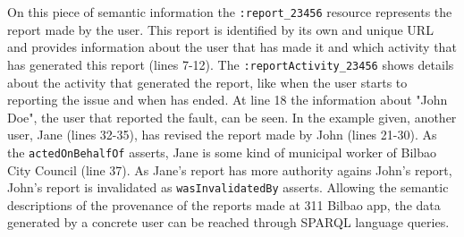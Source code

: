 On this piece of semantic information the \texttt{:report\_23456} resource represents the report made by the user. This report is identified by its own and unique URL and provides information about the user that has made it and which activity that has generated this report (lines 7-12). The \texttt{:reportActivity\_23456} shows details about the activity that generated the report, like when the user starts to reporting the issue and when has ended. At line 18 the information about "John Doe", the user that reported the fault, can be seen. In the example given, another user, Jane (lines 32-35), has revised the report made by John (lines 21-30). As the \texttt{actedOnBehalfOf} asserts, Jane is some kind of municipal worker of Bilbao City Council (line 37). As Jane's report has more authority agains John's report, John's report is invalidated as \texttt{wasInvalidatedBy} asserts. Allowing the semantic descriptions of the provenance of the reports made at 311 Bilbao app, the data generated by a concrete user can be reached through SPARQL \cite{prudhommeaux_sparql_2008} language queries.

